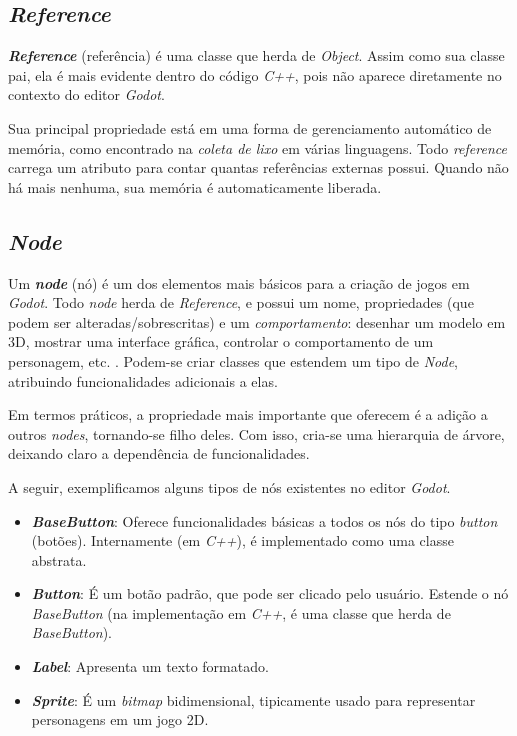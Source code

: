 
\subsection{\textit{Reference}}
\label{godotReference}

\textbf{\textit{Reference}} (referência) é uma classe que herda de \textit{Object}. Assim como sua classe pai, ela é mais evidente dentro do código \textit{C++}, pois não aparece diretamente no contexto do editor \textit{Godot}.

Sua principal propriedade está em uma forma de gerenciamento automático de memória, como encontrado na \textit{coleta de lixo} em várias linguagens. Todo \textit{reference} carrega um atributo para contar quantas referências externas possui. Quando não há mais nenhuma, sua memória é automaticamente liberada.


\subsection{\textit{Node}}
\label{godotNode}

Um \textbf{\textit{node}} (nó) é um dos elementos mais básicos para a criação de jogos em \textit{Godot}. Todo \textit{node} herda de \textit{Reference}, e possui um nome, propriedades (que podem ser alteradas/sobrescritas) e um \emph{comportamento}: desenhar um modelo em 3D, mostrar uma interface gráfica, controlar o comportamento de um personagem, etc. \citep{godotNode}. Podem-se criar classes que estendem um tipo de \textit{Node}, atribuindo funcionalidades adicionais a elas.

Em termos práticos, a propriedade mais importante que oferecem é a adição a outros \textit{nodes}, tornando-se filho deles. Com isso, cria-se uma hierarquia de árvore, deixando claro a dependência de funcionalidades.

A seguir, exemplificamos alguns tipos de nós existentes no editor \textit{Godot}.

\begin{itemize}
\item \textbf{\textit{BaseButton}}: Oferece funcionalidades básicas a todos os nós do tipo \textit{button} (botões). Internamente (em \textit{C++}), é implementado como uma classe abstrata.

\item \textbf{\textit{Button}}: É um botão padrão, que pode ser clicado pelo usuário. Estende o nó \textit{BaseButton} (na implementação em \textit{C++}, é uma classe que herda de \textit{BaseButton}).

\item \textbf{\textit{Label}}: Apresenta um texto formatado.

\item \textbf{\textit{Sprite}}: É um \textit{bitmap} bidimensional, tipicamente usado para representar personagens em um jogo 2D.
\end{itemize}

